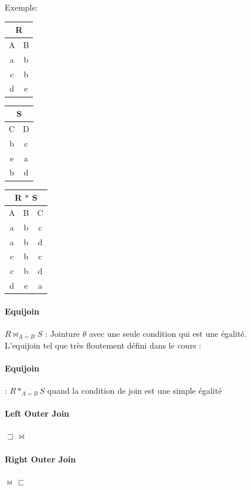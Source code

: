 \documentclass[a4paper]{article}
\begin{document}
    Exemple:
  \begin{tabular}{|c|c|}
	\multicolumn{2}{c}{R}\\
	\hline
	A & B\\
	\hline\hline
	a & b\\
	c & b\\
	d & e\\
	\hline
  \end{tabular}
  \begin{tabular}{|c|c|}
	\multicolumn{2}{c}{S}\\
	\hline
	C & D\\
	\hline\hline
	b & c\\
	e & a\\
	b & d\\
	\hline
  \end{tabular}
  \begin{tabular}{|c|c|c|}
	\multicolumn{3}{c}{\textcolor[rgb]{1,0,0}{R $*$ S}}\\
	\hline
	A & B & C\\
	\hline\hline
	a & b & c\\
	a & b & d\\
	c & b & c\\
	c & b & d\\
	d & e & a\\
	\hline
  \end{tabular}

  \paragraph{Equijoin} $R \bowtie_{A=B} S$ : Jointure $\theta$ avec une seule 
  condition qui est une égalité.\\

  L'equijoin tel que très floutement défini dans le cours :

  \paragraph{Equijoin} : $R *_{A=B} S$ quand la condition de join est une simple égalité

  \paragraph{Left Outer Join} $\sqsupset\,\bowtie$
  \paragraph{Right Outer Join} $\bowtie\,\sqsubset$
\end{document}
